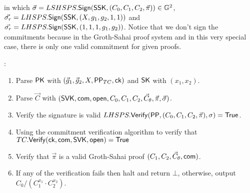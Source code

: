 \begin{description}
\begin{enumerate}
        
        in which $\vec{\sigma} = LSHSPS.{\mathsf{Sign}}(\mathsf{SSK}, (C_0, C_1, C_2, \vec{\pi})) \in \mathbb{G}^2$, $\vec{\sigma_r} = LHSPS.{\mathsf{Sign}}(\mathsf{SSK}, (X, g_1, g_2, 1, 1))$ and $\vec{\sigma_r} = LHSPS.{\mathsf{Sign}}(\mathsf{SSK}, (1, 1, 1, g_1, g_2))$.
        Notice that we don't sign the commitments because in the Groth-Sahai proof system and in this very special case, there is only one valid commitment for given proofs.
        
        
        
      \end{enumerate}
      
    \item[\boldmath{$RCCA3.\Dec(\PK, \vec{C}, \SK)$}]:
      \begin{enumerate}
      \item Parse $\mathsf{PK}$ with $(\vec{g}_1, \vec{g}_2, X, \mathsf{PP}_{TC}, \mathsf{ck})$ and $\mathsf{SK}$ with $(x_1, x_2)$.
      \item Parse $\vec{C}$ with $ (\mathsf{SVK}, \mathsf{com}, \mathsf{open}, C_0, C_1, C_2, \vec{C}_{\theta}, \vec{\pi}, \vec{\sigma})$.
      \item Verify the signature is valid $LHSPS.{\mathsf{Verify}}(\mathsf{PP},  (C_0, C_1, C_2, \vec{\pi}), \sigma) = \mathsf{True}$.
      \item Using the commitment verification algorithm to verify that $TC.{\mathsf{Verify}}(\mathsf{ck}, \mathsf{com}, \mathsf{SVK}, \mathsf{open}) = \mathsf{True}$
      \item Verify that $\vec{\pi}$ is a valid Groth-Sahai proof \wrt  $(C_1, C_2, \vec{C}_{\theta}, \mathsf{com})$.
      \item If any of the verification fails then halt and return $\bot$, otherwise, output $C_0/(C_1^{x_1}\cdot C_2^{x_2})$.
      \end{enumerate}
    
   	
   	\end{description} 
